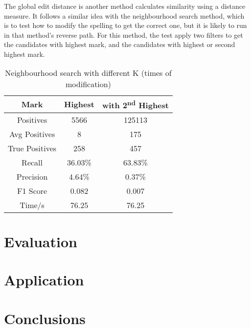 \documentclass[11pt]{article}
\begin{document}
The global edit distance is another method calculates similarity using a distance measure. It follows a similar idea with the neighbourhood search method, which is to test how to modify the spelling to get the correct one, but it is likely to run in that method's reverse path. For this method, the test apply two filters to get the candidates with highest mark, and the candidates with highest or second highest mark.

\begin{table}[h]
 \begin{center}
\begin{tabular}{ |c||c|c| }
      \hline
      Mark & Highest & with 2\textsuperscript{nd} Highest \\
      \hline
      Positives & 5566 & 125113\\
      Avg Positives & 8 & 175\\
      True Positives & 258 & 457\\
      Recall & 36.03\% & 63.83\%\\
      Precision & 4.64\% & 0.37\%\\
      F1 Score & 0.082 & 0.007\\
      Time/s & 76.25 & 76.25\\
      \hline
\end{tabular}
\caption{Neighbourhood search with different K (times of modification)}\label{table2}
 \end{center}
\end{table}



\section{Evaluation}


\section{Application}


\section{Conclusions}





\end{document}
